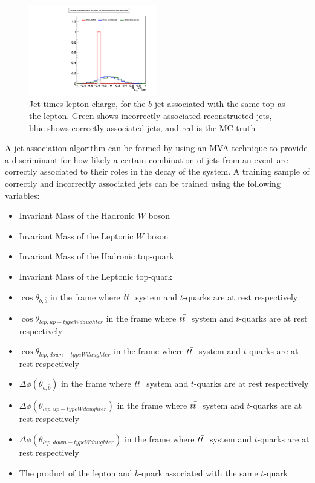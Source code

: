 \begin{figure}[hbtp] 
  {\centering
    \includegraphics[width=0.50\textwidth]{Figures/Analysis_Improvement_Diagrams/tt012jets__h_genParticle_lepBChargeLepCharge__vs__h_recoJets_correctAssoc_labFrame_lepBChargeLepCharge__vs__h_recoJets_wrongAssoc_labFrame_lepBChargeLepCharge__unitNorm.pdf}
    \caption{Jet times lepton charge, for the $b$-jet associated with
      the same top as the lepton.  Green shows incorrectly associated
      reconstructed jets, blue shows correctly associated jets, and
      red is the MC truth}
    \label{fig:aMCatNLO_lepJetCharge}}
\end{figure}

\par  A jet association algorithm can be formed by using an MVA
technique to provide a discriminant for how likely a certain
combination of jets from an event are correctly associated to their
roles in the decay of the \ttbar system.  A training sample of
correctly and incorrectly associated jets can be trained using the
following variables:

\begin{itemize}
  \item Invariant Mass of the Hadronic $W$ boson
  \item Invariant Mass of the Leptonic $W$ boson
  \item Invariant Mass of the Hadronic top-quark
  \item Invariant Mass of the Leptonic top-quark
  \item $\cos{\theta_{b, \bar{b}}}$ in the frame where $t{\bar{t}}~$ system and
    $t$-quarks are at rest respectively 
  \item $\cos{\theta_{lep, up-type W daughter}}$ in the frame where $t{\bar{t}}~$ system and
    $t$-quarks are at rest respectively 
  \item $\cos{\theta_{lep, down-type W daughter}}$ in the frame where $t{\bar{t}}~$ system and
    $t$-quarks are at rest respectively 
  \item $\Delta\phi(\theta_{b, \bar{b}})$ in the frame where $t{\bar{t}}~$ system and
    $t$-quarks are at rest respectively 
  \item $\Delta\phi(\theta_{lep, up-type W daughter})$ in the frame where $t{\bar{t}}~$ system and
    $t$-quarks are at rest respectively 
  \item $\Delta\phi(\theta_{lep, down-type W daughter})$ in the frame where $t{\bar{t}}~$ system and
    $t$-quarks are at rest respectively 
   \item The product of the lepton and $b$-quark associated with the
     same $t$-quark
\end{itemize}


